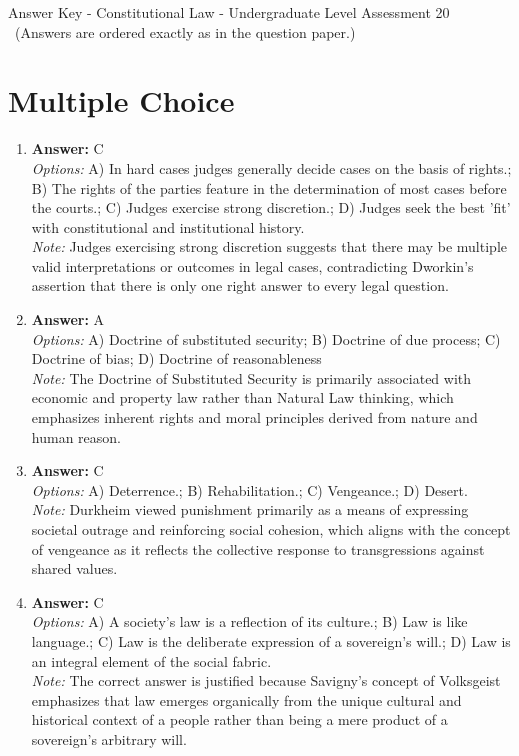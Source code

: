 \documentclass[12pt]{article}
\begin{document}
\begin{center}
Answer Key - Constitutional Law - Undergraduate Level Assessment 20 \
\small (Answers are ordered exactly as in the question paper.)
\end{center}

\section*{Multiple Choice}
\begin{enumerate}[label=\arabic*.]
\item \textbf{Answer:} C
\\ \textit{Options:} A) In hard cases judges generally decide cases on the basis of rights.; B) The rights of the parties feature in the determination of most cases before the courts.; C) Judges exercise strong discretion.; D) Judges seek the best 'fit' with constitutional and institutional history.
\\ \textit{Note:} Judges exercising strong discretion suggests that there may be multiple valid interpretations or outcomes in legal cases, contradicting Dworkin's assertion that there is only one right answer to every legal question.
\item \textbf{Answer:} A
\\ \textit{Options:} A) Doctrine of substituted security; B) Doctrine of due process; C) Doctrine of bias; D) Doctrine of reasonableness
\\ \textit{Note:} The Doctrine of Substituted Security is primarily associated with economic and property law rather than Natural Law thinking, which emphasizes inherent rights and moral principles derived from nature and human reason.
\item \textbf{Answer:} C
\\ \textit{Options:} A) Deterrence.; B) Rehabilitation.; C) Vengeance.; D) Desert.
\\ \textit{Note:} Durkheim viewed punishment primarily as a means of expressing societal outrage and reinforcing social cohesion, which aligns with the concept of vengeance as it reflects the collective response to transgressions against shared values.
\item \textbf{Answer:} C
\\ \textit{Options:} A) A society's law is a reflection of its culture.; B) Law is like language.; C) Law is the deliberate expression of a sovereign's will.; D) Law is an integral element of the social fabric.
\\ \textit{Note:} The correct answer is justified because Savigny's concept of Volksgeist emphasizes that law emerges organically from the unique cultural and historical context of a people rather than being a mere product of a sovereign's arbitrary will.

\end{enumerate}
\end{document}
